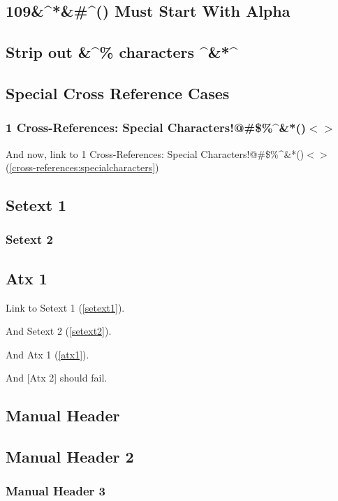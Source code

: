 
\def\mytitle{MultiMarkdown Autoreference Test  }

\subsection{109\&\^{}*\&\#\^{}() Must Start With Alpha}
\label{muststartwithalpha}


\subsection{Strip out \&\^{}\% characters \^{}\&*\^{}}
\label{stripoutcharacters}


\subsection{Special Cross Reference Cases}
\label{specialcrossreferencecases}


\subsubsection{1 Cross-References: Special Characters!@\#\$\%\^{}\&*()$<$$>$}
\label{cross-references:specialcharacters}


And now, link to 1 Cross-References: Special Characters!@\#\$\%\^{}\&*()$<$$>$ (\autoref{cross-references:specialcharacters})

\subsection{Setext 1}
\label{setext1}


\subsubsection{Setext 2}
\label{setext2}


\subsection{Atx 1}
\label{atx1}


Link to Setext 1 (\autoref{setext1}).

And Setext 2 (\autoref{setext2}).

And Atx 1 (\autoref{atx1}).

And [Atx 2] should fail.

\subsection{Manual Header}
\label{label}


\subsection{Manual Header 2}
\label{label2}


\subsubsection{Manual Header 3}
\label{label3}





